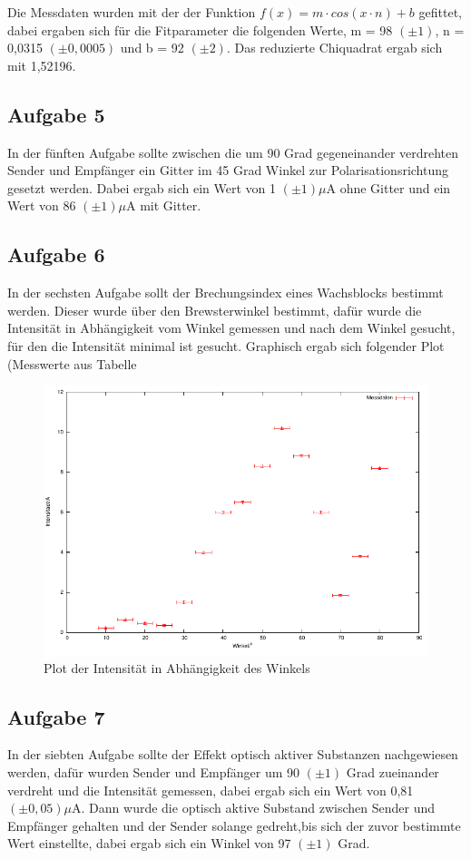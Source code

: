 \documentclass[12pt]{scrartcl}
\begin{document}
Die Messdaten wurden mit der der Funktion $ f(x) = m \cdot cos(x \cdot n) + b$ gefittet, dabei ergaben sich für die Fitparameter die folgenden Werte, m = 98 $(\pm 1)$, n = 0,0315 $(\pm 0,0005)$ und b = 92 $(\pm 2)$. Das reduzierte Chiquadrat ergab sich mit 1,52196.

\subsection{Aufgabe 5}
In der fünften Aufgabe sollte zwischen die um 90 Grad gegeneinander verdrehten Sender und Empfänger ein Gitter im 45 Grad Winkel zur Polarisationsrichtung gesetzt werden. Dabei ergab sich ein Wert von 1 $(\pm 1) \mu$A ohne Gitter und ein Wert von 86 $(\pm 1) \mu$A mit Gitter.

\subsection{Aufgabe 6}
In der sechsten Aufgabe sollt der Brechungsindex eines Wachsblocks bestimmt werden. Dieser wurde über den Brewsterwinkel bestimmt, dafür wurde die Intensität in Abhängigkeit vom Winkel gemessen und nach dem Winkel gesucht, für den die Intensität minimal ist gesucht. Graphisch ergab sich folgender Plot (Messwerte aus Tabelle %

\begin{figure}[H]
\centering
    \includegraphics[scale = 1]{a_6.pdf}
  	\caption[Plot der Intensität in Abhängigkeit des Winkels]{Plot der Intensität in Abhängigkeit des Winkels}
  \label{fig:a_6}
\end{figure}

\subsection{Aufgabe 7}
In der siebten Aufgabe sollte der Effekt optisch aktiver Substanzen nachgewiesen werden, dafür wurden Sender und Empfänger um 90 $(\pm 1)$ Grad zueinander verdreht und die Intensität gemessen, dabei ergab sich ein Wert von 0,81 $(\pm 0,05) \mu$A.  Dann wurde die optisch aktive Substand zwischen Sender und Empfänger gehalten und der Sender solange gedreht,bis sich der zuvor bestimmte Wert einstellte, dabei ergab sich ein Winkel von 97 $(\pm 1)$ Grad.



\end{document}
